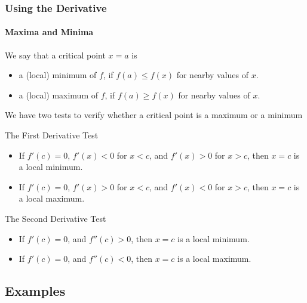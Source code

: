\documentclass[9pt,xcolor=x11names,compress]{beamer}
\begin{document}
\begin{frame}\frametitle{Using the Derivative}
    
\framesubtitle{Maxima and Minima}
\begin{definition}
	We say that a critical point $x=a$ is
	\begin{itemize}
		\item a (local) \alert{minimum} of $f$, if $f(a)\leq f(x)$ for nearby values of $x$.
		\item a (local) \alert{maximum} of $f$, if $f(a) \geq f(x)$ for nearby values of $x$.
	\end{itemize}
\end{definition}
\pause We have two tests to verify whether a critical point is a maximum or a minimum
\pause \begin{block}
	{The First Derivative Test}
	\begin{itemize}
		\item If $f'(c)=0$, $f'(x)<0$ for $x<c$, and $f'(x)>0$ for $x>c$, then $x=c$ is a local minimum.
		\item If $f'(c)=0$, $f'(x)>0$ for $x<c$, and $f'(x)<0$ for $x>c$, then $x=c$ is a local maximum.
	\end{itemize}
\end{block}

\pause \begin{block}
	{The Second Derivative Test}
	\begin{itemize}
		\item If $f'(c)=0$, and $f''(c)>0$, then $x=c$ is a local minimum.
		\item If $f'(c)=0$, and $f''(c)<0$, then $x=c$ is a local maximum.
	\end{itemize}
\end{block}
\end{frame}

\subsection{Examples}
\end{document}
